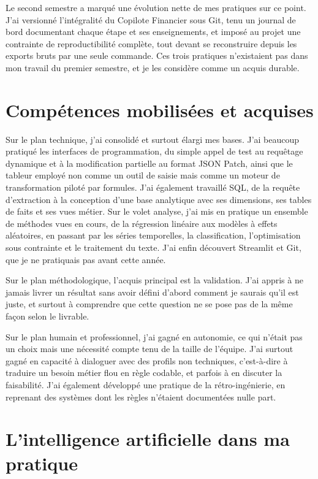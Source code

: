 Le second semestre a marqué une évolution nette de mes pratiques sur ce point. J'ai versionné
l'intégralité du Copilote Financier sous Git, tenu un journal de bord documentant chaque étape
et ses enseignements, et imposé au projet une contrainte de reproductibilité complète, tout
devant se reconstruire depuis les exports bruts par une seule commande. Ces trois pratiques
n'existaient pas dans mon travail du premier semestre, et je les considère comme un acquis
durable.

\section{Compétences mobilisées et acquises}

Sur le plan technique, j'ai consolidé et surtout élargi mes bases. J'ai beaucoup pratiqué les
interfaces de programmation, du simple appel de test au requêtage dynamique et à la modification
partielle au format JSON Patch, ainsi que le tableur employé non comme un outil de saisie mais
comme un moteur de transformation piloté par formules. J'ai également travaillé SQL, de la
requête d'extraction à la conception d'une base analytique avec ses dimensions, ses tables de
faits et ses vues métier. Sur le volet analyse, j'ai mis en pratique un ensemble de méthodes
vues en cours, de la régression linéaire aux modèles à effets aléatoires, en passant par les
séries temporelles, la classification, l'optimisation sous contrainte et le traitement du texte.
J'ai enfin découvert Streamlit et Git, que je ne pratiquais pas avant cette année.

Sur le plan méthodologique, l'acquis principal est la validation. J'ai appris à ne jamais livrer
un résultat sans avoir défini d'abord comment je saurais qu'il est juste, et surtout à
comprendre que cette question ne se pose pas de la même façon selon le livrable.

Sur le plan humain et professionnel, j'ai gagné en autonomie, ce qui n'était pas un choix mais
une nécessité compte tenu de la taille de l'équipe. J'ai surtout gagné en capacité à dialoguer
avec des profils non techniques, c'est-à-dire à traduire un besoin métier flou en règle codable,
et parfois à en discuter la faisabilité. J'ai également développé une pratique de la
rétro-ingénierie, en reprenant des systèmes dont les règles n'étaient documentées nulle part.

\section{L'intelligence artificielle dans ma pratique}

